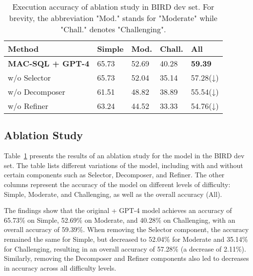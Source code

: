 \begin{table}[t]
\small
\centering
\begin{tabularx}{\columnwidth}{@{}l*{4}{X}@{}}
\toprule
\textbf{Method}                                 & \textbf{Simple} & \textbf{Mod.} & \textbf{Chall.} & \textbf{All}   \\ \midrule
{\color[HTML]{3370FF} \textbf{MAC-SQL + GPT-4}} & 65.73           & 52.69             & 40.28                & \textbf{59.39} \\
\quad w/o Selector                                    & 65.73           & 52.04             & 35.14                & 57.28(↓)   \\
\quad w/o Decomposer                                  & 61.51           & 48.82             & 38.89                & 55.54(↓)    \\
\quad w/o Refiner                                     & 63.24           & 44.52             & 33.33                & 54.76(↓)   \\ \bottomrule
\end{tabularx}
\caption{Execution accuracy of \ours{} ablation study in BIRD dev set. For brevity, the abbreviation "Mod." stands for "Moderate" while "Chall." denotes "Challenging".}
\label{tab:bird-ablation}
\end{table}

\subsection{Ablation Study}

 Table~\ref{tab:bird-ablation} presents the results of an ablation study for the \ours{} model in the BIRD dev set. 
The table lists different variations of the \ours{} model, including with and without certain components such as Selector, Decomposer, and Refiner. 
The other columns represent the accuracy of the model on different levels of difficulty: Simple, Moderate, and Challenging, as well as the overall accuracy (All).

The findings show that the original \ours{} + GPT-4 model achieves an accuracy of 65.73\% on Simple, 52.69\% on Moderate, and 40.28\% on Challenging, with an overall accuracy of 59.39\%. 
When removing the Selector component, the accuracy remained the same for Simple, but decreased to 52.04\% for Moderate and 35.14\% for Challenging, resulting in an overall accuracy of 57.28\% (a decrease of 2.11\%). 
Similarly, removing the Decomposer and Refiner components also led to decreases in accuracy across all difficulty levels.


